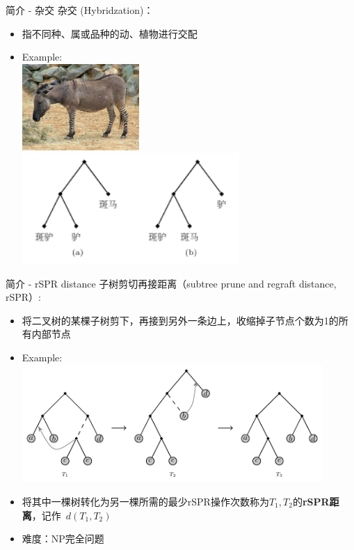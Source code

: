 \documentclass[slidestop,compress,mathserif,red]{beamer}
\begin{document}
\begin{frame}{简介 - 杂交}
    杂交 (Hybridzation)：
    \begin{itemize}
      \item 指不同种、属或品种的动、植物进行交配
      \pause
      \item Example: \\
      \includegraphics[width=0.35\textwidth, height=0.5\textheight, keepaspectratio]{./pic/zeedonk.jpg}
      \pause
      \includegraphics[width=0.65\textwidth]{./pic/3_animals.pdf}
    \end{itemize}
\end{frame}

\begin{frame}{简介 - rSPR distance}
    子树剪切再接距离（subtree prune and regraft distance, rSPR）:
    \begin{itemize}
      \item 将二叉树的某棵子树剪下，再接到另外一条边上，收缩掉子节点个数为1的所有内部节点
      \pause
      \item Example: \\
      \includegraphics[width=0.9\textwidth, height=0.5\textheight, keepaspectratio]{./pic/tree_spr.pdf}
      \pause
      \item 将其中一棵树转化为另一棵所需的最少rSPR操作次数称为$T_1,T_2$的\textbf{rSPR距离}，记作~$d(T_1,T_2)$
      \pause
      \item 难度：NP完全问题
    \end{itemize}
\end{frame}
\end{document}
